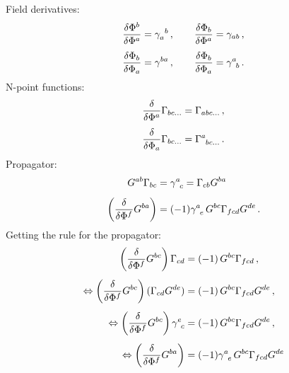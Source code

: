 \documentclass[aps,10pt,prd,nofootinbib,superscriptaddress,twocolumn]{revtex4-2}
\begin{document}
Field derivatives:
%
\begin{align}
	\frac{\delta \Phi^b}{\delta \Phi^a} &= \gamma_a^{\phantom{a}b}
	\,,\qquad
	\frac{\delta \Phi_b}{\delta \Phi^a} = \gamma_{ab}
	\,,\notag\\[1ex]
	\frac{\delta \Phi_b}{\delta \Phi_a} &= \gamma^{ba}
	\,,\qquad
	\frac{\delta \Phi_b}{\delta \Phi_a} = \gamma^{a}_{\phantom{a}b}
	\,.
\end{align}
%
N-point functions:
%
\begin{align}
	\frac{\delta }{\delta \Phi^a} \Gamma_{bc\ldots} = \Gamma_{abc\ldots}
	\,,\notag\\[1ex]
	\frac{\delta }{\delta \Phi_a} \Gamma_{bc\ldots} = \Gamma^{a}_{\phantom{a}bc\ldots}
	\,.
\end{align}
%
Propagator:
%
\begin{align}
	G^{ab}\Gamma_{bc} &= \gamma^{a}_{\phantom{a}c} =	\Gamma_{cb}G^{ba}
	\,\notag\\[1ex]
	\left(\frac{\delta}{\delta \Phi^f}G^{ba}\right) &= (-1)\gamma^a_{\phantom{a}e}\, G^{bc}\Gamma_{fcd}G^{de}
	\,.
\end{align}
%
Getting the rule for the propagator:
%
\begin{align}
	\left(\frac{\delta}{\delta \Phi^f}G^{bc}\right)\Gamma_{cd} &= (-1)\,G^{bc}\Gamma_{fcd}
	\,,\notag\\[1ex]
	\Leftrightarrow\left(\frac{\delta}{\delta \Phi^f}G^{bc}\right)(\Gamma_{cd}G^{de}) &= (-1)\,G^{bc}\Gamma_{fcd}G^{de}
	\,,\notag\\[1ex]
	\Leftrightarrow\left(\frac{\delta}{\delta \Phi^f}G^{bc}\right)\gamma^e_{\phantom{e}c} &= (-1)\,G^{bc}\Gamma_{fcd}G^{de}
	\,,\notag\\[1ex]
	\Leftrightarrow\left(\frac{\delta}{\delta \Phi^f}G^{ba}\right) &= (-1)\gamma^a_{\phantom{a}e}\, G^{bc}\Gamma_{fcd}G^{de}
\end{align}
\end{document}
